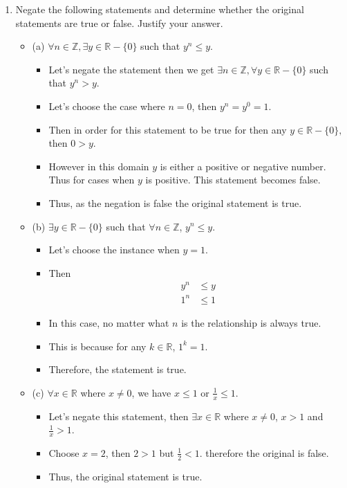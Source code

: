 \documentclass[letterpaper,12pt]{article}
\begin{document}
\begin{enumerate}
\begin{itemize}
	
\end{itemize}
\item Negate the following statements and determine whether the original statements  are true or false. Justify your answer.
\begin{itemize}
	\item (a) $\forall n \in \mathbb{Z},\exists y \in \mathbb{R}-\{0\}$ such that $y^n \leq y$.
	\begin{itemize}
	\item Let's negate the statement then we get $\exists n \in \mathbb{Z}, \forall y \in \mathbb{R} - \{0\}$ such that $y^n > y.$
	\item Let's choose the case where $n=0$, then $y^n = y^0 = 1$.
	\item Then in order for this statement to be true for then any $ y\in \mathbb{R} - \{0\},$ then $0>y.$
	\item However in this domain $y$ is either a positive or negative number. Thus for cases when $y$ is  positive. This statement becomes false.
	\item Thus, as the negation is false the original statement is true.
	\end{itemize}
	\item (b) $\exists y \in \mathbb{R} - \{0\}$ such that $\forall n \in \mathbb{Z}$, $y^n \leq y.$
	\begin{itemize}
	\item Let's choose the instance when $y=1$.
	\item Then
	\begin{align}
		y^n &\leq y \\ 1^n &\leq 1
	\end{align}
	\item In this case, no matter what $n$ is the relationship is always true.
	\item This is because for any $k\in \mathbb{R}$, $1^k=1$.
	\item Therefore, the statement is true.
	\end{itemize}
	\item (c) $\forall x \in \mathbb{R}$ where $x \neq 0 $, we have $x\leq 1$ or $\frac{1}{x} \leq 1$.
	\begin{itemize}
	\item Let's negate this statement, then $\exists x \in \mathbb{R}$ where $x \neq 0$, $x>1 $ and $\frac{1}{x} >1$.
	\item Choose $x=2$, then $2>1$ but $\frac{1}{2} <1.$ therefore the original is false.
	\item Thus, the original statement is true.
	\end{itemize}
\end{itemize}


\end{enumerate}
\end{document}

